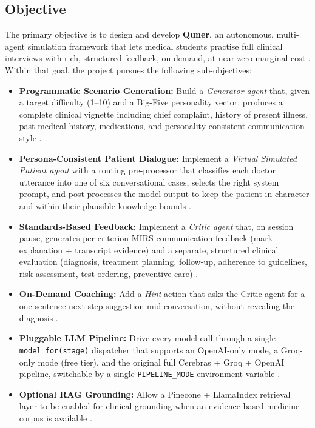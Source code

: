 \documentclass{article}
\begin{document}
\subsection{Objective}

The primary objective is to design and develop \textbf{Quner}, an autonomous, multi-agent simulation framework that lets medical students practise full clinical interviews with rich, structured feedback, on demand, at near-zero marginal cost \cite{Kulkarni2023TheEO}. Within that goal, the project pursues the following sub-objectives:

\begin{itemize}
    \item \textbf{Programmatic Scenario Generation:} Build a \emph{Generator agent} that, given a target difficulty (1--10) and a Big-Five personality vector, produces a complete clinical vignette including chief complaint, history of present illness, past medical history, medications, and personality-consistent communication style \cite{Topsakal2023CreatingLL}.
    \item \textbf{Persona-Consistent Patient Dialogue:} Implement a \emph{Virtual Simulated Patient agent} with a routing pre-processor that classifies each doctor utterance into one of six conversational cases, selects the right system prompt, and post-processes the model output to keep the patient in character and within their plausible knowledge bounds \cite{Zhang2023SentimentAI}.
    \item \textbf{Standards-Based Feedback:} Implement a \emph{Critic agent} that, on session pause, generates per-criterion MIRS communication feedback (mark + explanation + transcript evidence) and a separate, structured clinical evaluation (diagnosis, treatment planning, follow-up, adherence to guidelines, risk assessment, test ordering, preventive care) \cite{Mahajan2022TextualDQ}.
    \item \textbf{On-Demand Coaching:} Add a \emph{Hint} action that asks the Critic agent for a one-sentence next-step suggestion mid-conversation, without revealing the diagnosis \cite{Krugmann2024SentimentAI}.
    \item \textbf{Pluggable LLM Pipeline:} Drive every model call through a single \texttt{model\_for(stage)} dispatcher that supports an OpenAI-only mode, a Groq-only mode (free tier), and the original full Cerebras + Groq + OpenAI pipeline, switchable by a single \texttt{PIPELINE\_MODE} environment variable \cite{Zhao2023ASO}.
    \item \textbf{Optional RAG Grounding:} Allow a Pinecone + LlamaIndex retrieval layer to be enabled for clinical grounding when an evidence-based-medicine corpus is available \cite{Monir2024VectorSearchED}.

\end{itemize}
\end{document}

